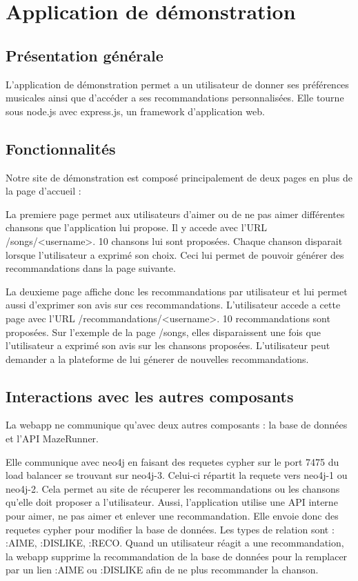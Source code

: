 \section{Application de démonstration}

\subsection{Présentation générale}

L'application de démonstration permet a un utilisateur de donner ses préférences musicales ainsi que d'accéder a ses recommandations personnalisées.
Elle tourne sous node.js avec express.js, un framework d'application web.
\subsection{Fonctionnalités}

Notre site de démonstration est composé principalement de deux pages en plus de la page d'accueil :

La premiere page permet aux utilisateurs d'aimer ou de ne pas aimer différentes chansons que l'application lui propose. Il y accede avec l'URL /songs/<username>.
10 chansons lui sont proposées. Chaque chanson disparait lorsque l'utilisateur a exprimé son choix. Ceci lui permet de pouvoir générer des recommandations dans la page suivante.

La deuxieme page affiche donc les recommandations par utilisateur et lui permet aussi d'exprimer son avis sur ces recommandations. L'utilisateur accede a cette page avec l'URL /recommandations/<username>.
10 recommandations sont proposées. Sur l'exemple de la page /songs, elles disparaissent une fois que l'utilisateur a exprimé son avis sur les chansons proposées. L'utilisateur peut demander a la plateforme de lui génerer de nouvelles recommandations.

\subsection{Interactions avec les autres composants}

La webapp ne communique qu'avec deux autres composants : la base de données et l'API MazeRunner.

Elle communique avec neo4j en faisant des requetes cypher sur le port 7475 du load balancer se trouvant sur neo4j-3. Celui-ci répartit la requete vers neo4j-1 ou neo4j-2. Cela permet au site de récuperer les recommandations ou les chansons qu'elle doit proposer a l'utilisateur.
Aussi, l'application utilise une API interne pour aimer, ne pas aimer et enlever une recommandation. Elle envoie donc des requetes cypher pour modifier la base de données. Les types de relation sont : :AIME, :DISLIKE, :RECO.
Quand un utilisateur réagit a une recommandation, la webapp supprime la recommandation de la base de données pour la remplacer par un lien :AIME ou :DISLIKE afin de ne plus recommander la chanson.

